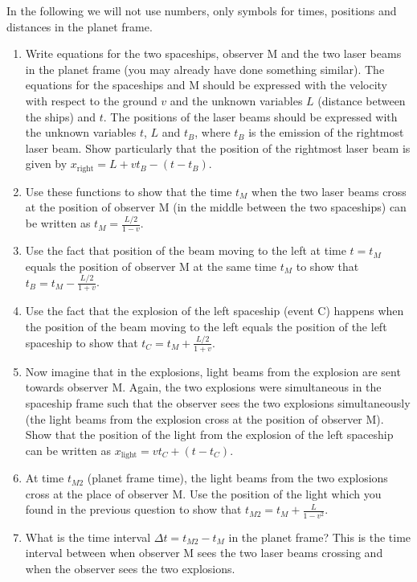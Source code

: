 {\begin{multicols}{2}
In the following we will not use numbers, only symbols for times,
positions and distances in the planet frame.

\begin{enumerate}

\item Write equations for the two spaceships, observer M and the two laser beams in the planet frame (you may already have done something similar). The equations for the spaceships and M should be expressed with the velocity with respect to the ground $v$ and the unknown variables $L$ (distance between the ships) and $t$. The positions of the laser beams should be expressed with the unknown variables $t$, $L$ and $t_B$, where $t_B$ is the emission of the rightmost laser beam. Show particularly that the position of the rightmost laser beam is given by $x_\mathrm{right}=L+vt_B-(t-t_B)$.

\item Use these functions to show that the time $t_M$ when the two
laser beams cross at the position of observer M (in the middle between the two spaceships) can be written as $t_M=\frac{L/2}{1-v}$.

\item Use the fact that position of the beam moving to the left at
time $t=t_M$ equals the position of observer M at the same time $t_M$ to show that $t_B=t_M-\frac{L/2}{1+v}$.

\item Use the fact that the explosion of the left spaceship (event C) happens when the position of the beam moving to the left equals the position of the left spaceship to show that $t_C=t_M+\frac{L/2}{1+v}$.

\item Now imagine that in the explosions, light beams from the
explosion are sent towards observer M. Again, the two explosions were
simultaneous in the spaceship frame such that the observer sees the
two explosions simultaneously (the light beams from the explosion
cross at the position of observer M). Show that the position of the light from the explosion of the left spaceship can be written as $x_\mathrm{light}=vt_C+(t-t_C)$.

\item At time $t_{M2}$ (planet frame time), the light beams from the
two explosions cross at the place of observer M. Use the position of the light which you found in the previous question to show that $t_{M2}=t_M+\frac{L}{1-v^2}$.

\item What is the time interval $\Delta t=t_{M2}-t_M$ in the planet frame? This is the time interval between when observer M sees the two laser beams crossing and when the observer sees the two explosions.


\end{enumerate}
\end{multicols}}
